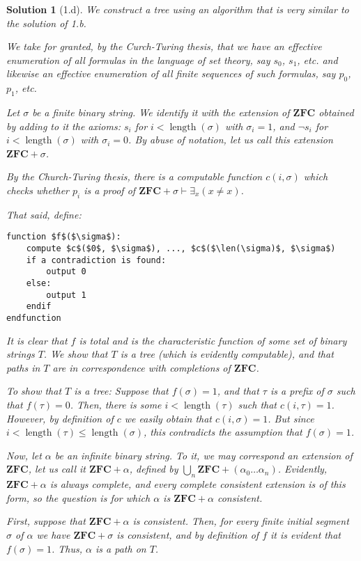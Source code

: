 \documentclass{article}
\theoremstyle{nonumberplain}
\newtheorem{sol}{Solution}
\DeclareMathOperator{\len}{length}
\newcommand{\ZFC}{\mathbf{ZFC}}
\begin{document}
\begin{sol}[1.d]
We construct a tree using an algorithm that is very similar to the solution of 1.b.

We take for granted, by the Curch-Turing thesis, that we have an effective enumeration of all formulas in the language of set theory, say $s_0$, $s_1$, etc. and likewise an effective enumeration of all finite sequences of such formulas, say $p_0$, $p_1$, etc.

Let $\sigma$ be a finite binary string. We identify it with the extension of $\ZFC$ obtained by adding to it the axioms: $s_i$ for $i < \len(\sigma)$ with $\sigma_i = 1$, and $\neg s_i$ for $i < \len(\sigma)$ with $\sigma_i = 0$. By abuse of notation, let us call this extension $\ZFC+\sigma$.

By the Church-Turing thesis, there is a computable function $c(i,\sigma)$ which checks whether $p_i$ is a proof of $\ZFC+\sigma \vdash \exists_x (x \neq x)$.

That said, define:
\begin{lstlisting}
function $f$($\sigma$):
    compute $c$($0$, $\sigma$), ..., $c$($\len(\sigma)$, $\sigma$)
    if a contradiction is found:
        output 0
    else:
        output 1
    endif
endfunction
\end{lstlisting}

It is clear that $f$ is total and is the characteristic function of some set of binary strings $T$. We show that $T$ is a tree (which is evidently computable), and that paths in $T$ are in correspondence with completions of $\ZFC$.

To show that $T$ is a tree: Suppose that $f(\sigma) = 1$, and that $\tau$ is a prefix of $\sigma$ such that $f(\tau) = 0$. Then, there is some $i < \len(\tau)$ such that $c(i,\tau) = 1$. However, by definition of $c$ we easily obtain that $c(i,\sigma) = 1$. But since $i < \len(\tau) \leq \len(\sigma)$, this contradicts the assumption that $f(\sigma) = 1$.

Now, let $\alpha$ be an infinite binary string. To it, we may correspond an extension of $\ZFC$, let us call it $\ZFC + \alpha$, defined by $\bigcup_n \ZFC + (\alpha_0 \dots \alpha_n)$. Evidently, $\ZFC + \alpha$ is always complete, and every complete consistent extension is of this form, so the question is for which $\alpha$ is $\ZFC + \alpha$ consistent.

First, suppose that $\ZFC + \alpha$ is consistent. Then, for every finite initial segment $\sigma$ of $\alpha$ we have $\ZFC + \sigma$ is consistent, and by definition of $f$ it is evident that $f(\sigma) = 1$. Thus, $\alpha$ is a path on $T$.


\end{sol}
\end{document}
